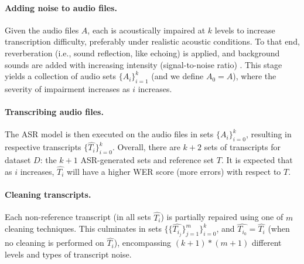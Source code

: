 \paragraph{Adding noise to audio files.}
Given the audio files $A$, each is acoustically impaired at $k$ levels to increase transcription difficulty, preferably under realistic acoustic conditions.
To that end, reverberation (i.e., sound reflection, like echoing) is applied, and background sounds are added with increasing intensity (signal-to-noise ratio) \citep{wang2018speechsep}.
This stage yields a collection of audio sets $\{A_i\}_{i=1}^k$ (and we define $A_0 = A$), where the severity of impairment increases as $i$ increases.

\paragraph{Transcribing audio files.}
The ASR model is then executed on the audio files in sets $\{A_i\}_{i=0}^k$, resulting in respective transcripts $\{\widehat{T_i}\}_{i=0}^k$. Overall, there are $k+2$ sets of transcripts for dataset $D$: the $k+1$ ASR-generated sets and reference set $T$. It is expected that as $i$ increases, $\widehat{T_i}$ will have a higher WER score (more errors) with respect to $T$.

\paragraph{Cleaning transcripts.}
Each non-reference transcript (in all sets $\widehat{T_i}$) is partially repaired using one of $m$ cleaning techniques. This culminates in sets $\{\{\widehat{T_{i_j}}\}_{j=1}^m\}_{i=0}^k$, and $\widehat{T_{i_0}} = \widehat{T_i}$ (when no cleaning is performed on $\widehat{T_i}$), encompassing $(k+1)*(m+1)$ different levels and types of transcript noise.


